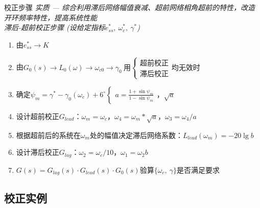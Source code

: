 \documentclass[handout,cjkutf8,table,aspectratio=1610]{beamer} %
\begin{document}
\begin{frame}{校正步骤}
	\emph{\color{red}实质 — 综合利用滞后网络幅值衰减、超前网络相角超前的特性，改造开环频率特性，提高系统性能}\\
	\emph{滞后-超前校正步骤  (设给定指标$e_{ss}^*,~\omega_c^*,~\gamma^*$)}
	\begin{enumerate}[(1)]
		\item 由$e_{ss}^*\rightarrow K$
		\item 由$G_0(s)\rightarrow L_0(\omega)\rightarrow \omega_{c0}\rightarrow\gamma_0~\text{用}\begin{cases}\text{超前校正}\\ \text{滞后校正}\end{cases}\text{均无效时}$
		\item 确定$\psi_m = \gamma^* - \gamma_0(\omega_c)+6^\circ \begin{cases}a=\frac{1+\sin\psi_m}{1-\sin\psi_m}\end{cases}$，$\sqrt{a}$
		\item 设计超前校正$G_{lead}$：$\omega_m=\omega_c$，$\omega_4=\omega_m*\sqrt{a}$，$\omega_3=\omega_4/a$
		\item 根据超前后的系统在$\omega_m$处的幅值决定滞后网络系数：$L_{lead}(\omega_m)=-20\lg b$
		\item 设计滞后校正$G_{lag}$：$\omega_2=\omega_c/10$，$\omega_1=\omega_2b$
		\item $G(s) = G_{lag}(s)\cdot G_{lead}(s) \cdot G_0(s)$验算$\{\omega_c,~\gamma\}$是否满足要求
	\end{enumerate}
\end{frame}

\subsection{校正实例}

\end{document}
